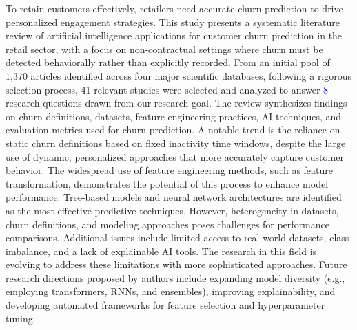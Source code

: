 
\noindent To retain customers effectively, retailers need accurate churn prediction to drive personalized engagement strategies. This study presents a systematic literature review of artificial intelligence applications for customer churn prediction in the retail sector, with a focus on non-contractual settings where churn must be detected behaviorally rather than explicitly recorded. From an initial pool of 1,370 articles identified across four major scientific databases, following a rigorous selection process, 41 relevant studies were selected and analyzed to answer \textcolor{blue}{8} research questions drawn from our research goal. The review synthesizes findings on churn definitions, datasets, feature engineering practices, AI techniques, and evaluation metrics used for churn prediction. A notable trend is the reliance on static churn definitions based on fixed inactivity time windows, despite the large use of dynamic, personalized approaches that more accurately capture customer behavior. The widespread use of feature engineering methods, such as feature transformation, demonstrates the potential of this process to enhance model performance.
Tree-based models and neural network architectures are identified as the most effective predictive techniques. However, heterogeneity in datasets, churn definitions, and modeling approaches poses challenges for performance comparisons. Additional issues include limited access to real-world datasets, class imbalance, and a lack of explainable AI tools. The research in this field is evolving to address these limitations with more sophisticated approaches. Future research directions proposed by authors include expanding model diversity (e.g., employing transformers, RNNs, and ensembles), improving explainability, and developing automated frameworks for feature selection and hyperparameter tuning.













